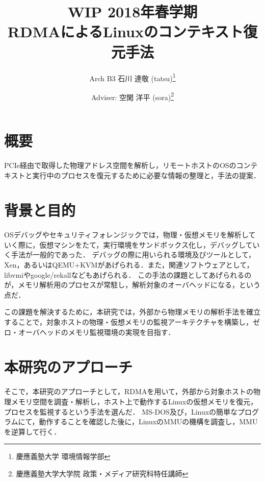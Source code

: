 \documentclass[a4j,10pt]{jsarticle}
\begin{document}

    \title{
        WIP 2018年春学期 \\
        RDMAによるLinuxのコンテキスト復元手法
    }

    \author{
        Arch B3 石川 達敬 (tatsu)\thanks{慶應義塾大学 環境情報学部}
        \and
        Adviser: 空閑 洋平 (sora)\thanks{慶應義塾大学大学院 政策・メディア研究科特任講師}
    }

    \maketitle

    \section{概要}

    PCIe経由で取得した物理アドレス空間を解析し，リモートホストのOSのコンテキストと実行中のプロセスを復元するために必要な情報の整理と，手法の提案．

    \section{背景と目的}

    OSデバッグやセキュリティフォレンジックでは，物理・仮想メモリを解析していく際に，仮想マシンをたて，実行環境をサンドボックス化し，デバッグしていく手法が一般的であった．
    デバッグの際に用いられる環境及びツールとして，Xen，あるいはQEMU+KVMがあげられる．また，関連ソフトウェアとして，libvmi\cite{libvmi}やgoogle/rekallなどもあげられる．
    この手法の課題としてあげられるのが，メモリ解析用のプロセスが常駐し，解析対象のオーバヘッドになる，という点だ．

    この課題を解決するために，本研究では，外部から物理メモリの解析手法を確立することで，対象ホストの物理・仮想メモリの監視アーキテクチャを構築し，ゼロ・オーバヘッドのメモリ監視環境の実現を目指す．

    \section{本研究のアプローチ}

    そこで，本研究のアプローチとして，RDMAを用いて，外部から対象ホストの物理メモリ空間を調査・解析し，ホスト上で動作するLinuxの仮想メモリを復元，プロセスを監視するという手法を選んだ．
    MS-DOS及び，Linuxの簡単なプログラムにて，動作することを確認した後に，LinuxのMMUの機構を調査し，MMUを逆算して行く．
\end{document}
